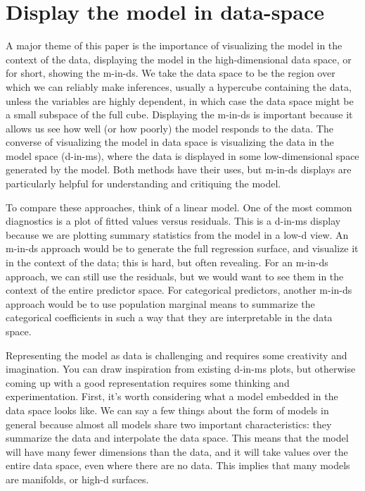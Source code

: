 \documentclass[preprint]{imsart}
\begin{document}
\section{Display the model in data-space}
\label{sec:m-in-ds}

A major theme of this paper is the importance of visualizing the model in the context of the data, displaying the model in the high-dimensional data space, or for short, showing the m-in-ds. We take the data space to be the region over which we can reliably make inferences, usually a hypercube containing the data, unless the variables are highly dependent, in which case the data space might be a small subspace of the full cube. Displaying the m-in-ds is important because it allows us see how well (or how poorly) the model responds to the data. The converse of visualizing the model in data space is visualizing the data in the model space (d-in-ms), where the data is displayed in some low-dimensional space generated by the model. Both methods have their uses, but m-in-ds displays are particularly helpful for understanding and critiquing the model.

To compare these approaches, think of a linear model. One of the most common diagnostics is a plot of fitted values versus residuals. This is a d-in-ms display because we are plotting summary statistics from the model in a low-d view. An m-in-ds approach would be to generate the full regression surface, and visualize it in the context of the data; this is hard, but often revealing. For an m-in-ds approach, we can still use the residuals, but we would want to see them in the context of the entire predictor space. For categorical predictors, another m-in-ds approach would be to use population marginal means \citep{searle:1980} to summarize the categorical coefficients in such a way that they are interpretable in the data space.

Representing the model as data is challenging and requires some creativity and imagination. You can draw inspiration from existing d-in-ms plots, but otherwise coming up with a good representation requires some thinking and experimentation. First, it's worth considering what a model embedded in the data space  looks like. We can say a few things about the form of models in general because almost all models share two important characteristics: they summarize the data and interpolate the data space. This means that the model will have many fewer dimensions than the data, and it will take values over the entire data space, even where there are no data. This implies that many models are manifolds, or high-d surfaces.
\end{document}
